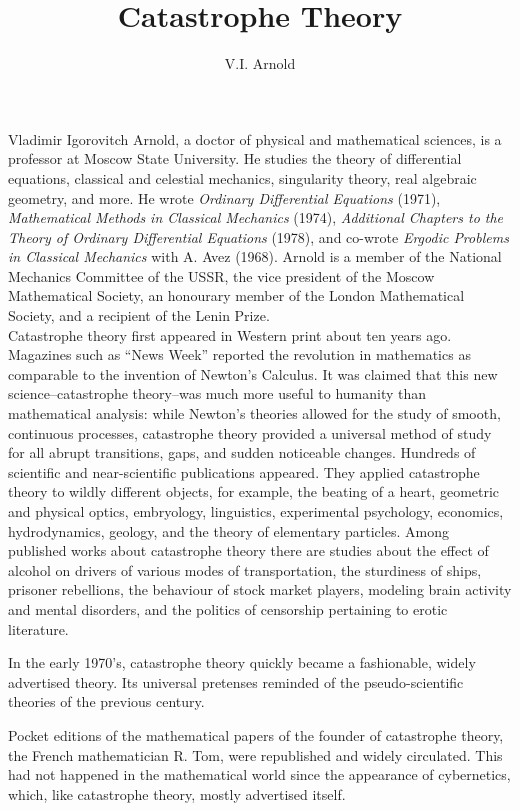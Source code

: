 \documentclass[12pt]{amsart}
\title{Catastrophe Theory}
\author{V.I. Arnold}
\begin{document}
\maketitle
{\fontsize{9pt}{1em}\selectfont
Vladimir Igorovitch Arnold, a doctor of physical and mathematical sciences, is a
professor at Moscow State University.
He studies the theory of differential equations, classical and celestial
mechanics, singularity theory, real algebraic geometry, and more.
He wrote \textit{Ordinary Differential Equations} (1971), \textit{Mathematical
Methods in Classical Mechanics} (1974), \textit{Additional Chapters to the
Theory of Ordinary Differential Equations} (1978), and co-wrote \textit{Ergodic
Problems in Classical Mechanics} with A. Avez (1968).
Arnold is a member of the National Mechanics Committee of the USSR, the vice
president of the Moscow Mathematical Society, an honourary member of the London
Mathematical Society, and a recipient of the Lenin Prize.}\\

Catastrophe theory first appeared in Western print about ten years ago.
Magazines such as ``News Week'' reported the revolution in mathematics as
comparable to the invention of Newton's Calculus.
It was claimed that this new science--catastrophe theory--was much more
useful to humanity than mathematical analysis: while Newton's theories allowed
for the study of smooth, continuous processes, catastrophe theory provided a
universal method of study for all abrupt transitions, gaps, and sudden
noticeable changes.
Hundreds of scientific and near-scientific publications appeared.
They applied catastrophe theory to wildly different objects, for example, the
beating of a heart, geometric and physical optics, embryology, linguistics,
experimental psychology, economics, hydrodynamics, geology, and the theory of
elementary particles.
Among published works about catastrophe theory there are studies about the
effect of alcohol on drivers of various modes of transportation, the sturdiness
of ships, prisoner rebellions, the behaviour of stock market players, modeling
brain activity and mental disorders, and the politics of censorship pertaining
to erotic literature.

In the early 1970's, catastrophe theory quickly became a fashionable, widely
advertised theory.
Its universal pretenses reminded of the pseudo-scientific theories of the
previous century.

Pocket editions of the mathematical papers of the founder of catastrophe theory,
the French mathematician R. Tom, were republished and widely circulated.
This had not happened in the mathematical world since the appearance of
cybernetics, which, like catastrophe theory, mostly advertised itself.
\end{document}

